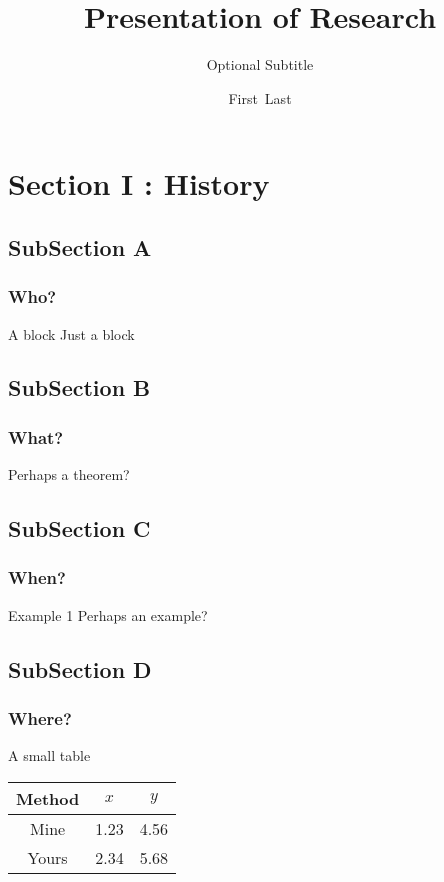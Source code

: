 \documentclass[unknownkeysallowed]{beamer}
\title[My Research] %
{Presentation of Research}
\subtitle{Optional Subtitle} %
\author[First Last] %
{First~Last}
\institute[NCSU]
{
  Department of Statistics\\%
  North Carolina State University
}
\begin{document}
\begin{frame}
  \titlepage
\end{frame}

\section{Section I : History}

\subsection{SubSection A}

\begin{frame}
  \frametitle{Who?}
  \begin{block}{A block}
  Just a block
  \end{block}
\end{frame}

\subsection{SubSection B}
\begin{frame}
  \frametitle{What?}
  \begin{theorem}
  Perhaps a theorem?
  \end{theorem}
\end{frame}

\subsection{SubSection C}
\begin{frame}
  \frametitle{When?}
  \begin{exampleblock}{Example 1}
  Perhaps an example?
  \end{exampleblock}
\end{frame}

\subsection{SubSection D}
\begin{frame}
  \frametitle{Where?}
  \begin{block}{A small table}
  \begin{center}
  \begin{tabular}{ccc}
  \toprule
  Method & $x$ & $y$ \\
  \midrule
  Mine  & 1.23 & 4.56 \\
  Yours & 2.34 & 5.68 \\
  \bottomrule
  \end{tabular}
  \end{center}
  \end{block}
\end{frame}
\end{document}
